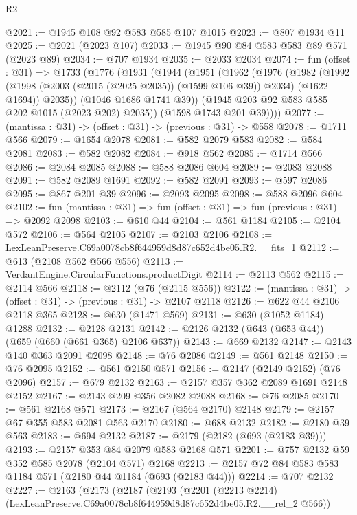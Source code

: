 \begin{lexlean}{R2}
\begin{coremodule}
@2021 := @1945 @108 @92 @583 @585 @107 @1015
@2023 := @807 @1934 @11
@2025 := @2021 (@2023 @107)
@2033 := @1945 @90 @84 @583 @583 @89 @571 (@2023 @89)
@2034 := @707 @1934
@2035 := @2033 @2034
@2074 := fun (offset : @31) =>
  @1733
    (@1776
      (@1931
        (@1944
          (@1951
            (@1962
              (@1976
                (@1982
                  (@1992 (@1998 (@2003 (@2015 (@2025 @2035)) (@1599 @106 @39)) @2034) (@1622 @1694))
                  @2035))
              (@1046 @1686 @1741 @39))
            (@1945 @203 @92 @583 @585 @202 @1015 (@2023 @202) @2035))
          (@1598 @1743 @201 @39))))
@2077 := (mantissa : @31) -> (offset : @31) -> (previous : @31) -> @558
@2078 := @1711 @566
@2079 := @1654 @2078
@2081 := @582 @2079 @583
@2082 := @584 @2081
@2083 := @582 @2082
@2084 := @918 @562
@2085 := @1714 @566
@2086 := @2084 @2085
@2088 := @588 @2086 @604
@2089 := @2083 @2088
@2091 := @582 @2089 @1691
@2092 := @582 @2091
@2093 := @597 @2086
@2095 := @867 @201 @39
@2096 := @2093 @2095
@2098 := @588 @2096 @604
@2102 := fun (mantissa : @31) => fun (offset : @31) => fun (previous : @31) => @2092 @2098
@2103 := @610 @44
@2104 := @561 @1184
@2105 := @2104 @572
@2106 := @564 @2105
@2107 := @2103 @2106
@2108 := LexLeanPreserve.C69a0078cb8f644959d8d87c652d4be05.R2.__fits_1
@2112 := @613 (@2108 @562 @566 @556)
@2113 := VerdantEngine.CircularFunctions.productDigit
@2114 := @2113 @562
@2115 := @2114 @566
@2118 := @2112 (@76 (@2115 @556))
@2122 := (mantissa : @31) -> (offset : @31) -> (previous : @31) -> @2107 @2118
@2126 := @622 @44 @2106 @2118 @365
@2128 := @630 (@1471 @569)
@2131 := @630 (@1052 @1184) @1288
@2132 := @2128 @2131
@2142 := @2126 @2132 (@643 (@653 @44)) (@659 (@660 (@661 @365) @2106 @637))
@2143 := @669 @2132
@2147 := @2143 @140 @363 @2091 @2098
@2148 := @76 @2086
@2149 := @561 @2148
@2150 := @76 @2095
@2152 := @561 @2150 @571
@2156 := @2147 (@2149 @2152) (@76 @2096)
@2157 := @679 @2132
@2163 := @2157 @357 @362 @2089 @1691 @2148 @2152
@2167 := @2143 @209 @356 @2082 @2088
@2168 := @76 @2085
@2170 := @561 @2168 @571
@2173 := @2167 (@564 @2170) @2148
@2179 := @2157 @67 @355 @583 @2081 @563 @2170
@2180 := @688 @2132
@2182 := @2180 @39 @563
@2183 := @694 @2132
@2187 := @2179 (@2182 (@693 (@2183 @39)))
@2193 := @2157 @353 @84 @2079 @583 @2168 @571
@2201 := @757 @2132 @59 @352 @585 @2078 (@2104 @571) @2168
@2213 := @2157 @72 @84 @583 @583 @1184 @571 (@2180 @44 @1184 (@693 (@2183 @44)))
@2214 := @707 @2132
@2227 := @2163
    (@2173
      (@2187
        (@2193
          (@2201 (@2213 @2214) (LexLeanPreserve.C69a0078cb8f644959d8d87c652d4be05.R2.__rel_2 @566))

\end{coremodule}
\end{lexlean}
